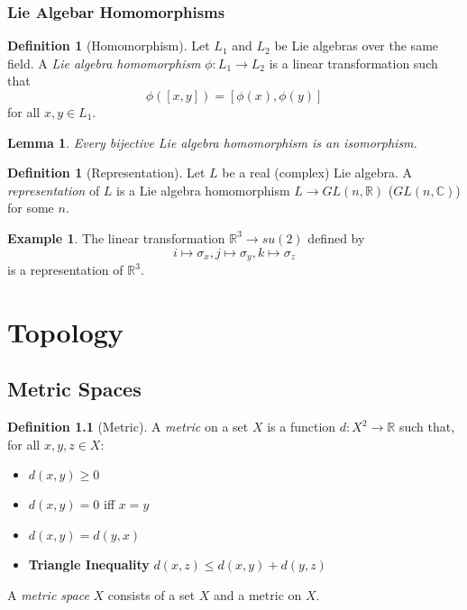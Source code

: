 \documentclass{book}
\newtheorem{lm}[prop]{Lemma}
\theoremstyle{definition}
\newtheorem{df}[prop]{Definition}
\newtheorem{ex}[prop]{Example}
\begin{document}

\section{Lie Algebar Homomorphisms}

\begin{df}[Homomorphism]
Let $L_1$ and $L_2$ be Lie algebras over the same field. A \emph{Lie algebra homomorphism} $\phi : L_1 \rightarrow L_2$ is a linear transformation such that
\[ \phi([x,y]) = [\phi(x), \phi(y)] \]
for all $x,y \in L_1$.
\end{df}

\begin{lm}
Every bijective Lie algebra homomorphism is an isomorphism.
\end{lm}


\begin{df}[Representation]
Let $L$ be a real (complex) Lie algebra. A \emph{representation} of $L$ is a Lie algebra homomorphism $L \rightarrow GL(n, \mathbb{R})$ ($GL(n, \mathbb{C})$) for some $n$.
\end{df}

\begin{ex}
The linear transformation $\mathbb{R}^3 \rightarrow su(2)$ defined by
\[ i \mapsto \sigma_x, j \mapsto \sigma_y, k \mapsto \sigma_z \]
is a representation of $\mathbb{R}^3$.
\end{ex}

\part{Topology}

\chapter{Metric Spaces}

\begin{df}[Metric]
A \emph{metric} on a set $X$ is a function $d : X^2 \rightarrow \mathbb{R}$ such that, for all $x,y,z \in X$:
\begin{itemize}
\item $d(x,y) \geq 0$
\item $d(x,y) = 0$ iff $x = y$
\item $d(x,y) = d(y,x)$
\item \textbf{Triangle Inequality} $d(x,z) \leq d(x,y) + d(y,z)$
\end{itemize}

A \emph{metric space} $X$ consists of a set $X$ and a metric on $X$.
\end{df}
\end{document}
